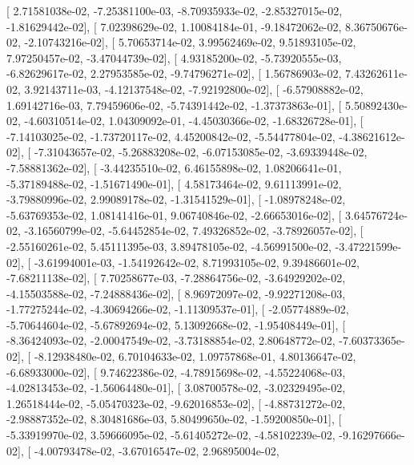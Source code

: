 \documentclass{article}
\begin{document}
       [  2.71581038e-02,  -7.25381100e-03,  -8.70935933e-02,
         -2.85327015e-02,  -1.81629442e-02],
       [  7.02398629e-02,   1.10084184e-01,  -9.18472062e-02,
          8.36750676e-02,  -2.10743216e-02],
       [  5.70653714e-02,   3.99562469e-02,   9.51893105e-02,
          7.97250457e-02,  -3.47044739e-02],
       [  4.93185200e-02,  -5.73920555e-03,  -6.82629617e-02,
          2.27953585e-02,  -9.74796271e-02],
       [  1.56786903e-02,   7.43262611e-02,   3.92143711e-03,
         -4.12137548e-02,  -7.92192800e-02],
       [ -6.57908882e-02,   1.69142716e-03,   7.79459606e-02,
         -5.74391442e-02,  -1.37373863e-01],
       [  5.50892430e-02,  -4.60310514e-02,   1.04309092e-01,
         -4.45030366e-02,  -1.68326728e-01],
       [ -7.14103025e-02,  -1.73720117e-02,   4.45200842e-02,
         -5.54477804e-02,  -4.38621612e-02],
       [ -7.31043657e-02,  -5.26883208e-02,  -6.07153085e-02,
         -3.69339448e-02,  -7.58881362e-02],
       [ -3.44235510e-02,   6.46155898e-02,   1.08206641e-01,
         -5.37189488e-02,  -1.51671490e-01],
       [  4.58173464e-02,   9.61113991e-02,  -3.79880996e-02,
          2.99089178e-02,  -1.31541529e-01],
       [ -1.08978248e-02,  -5.63769353e-02,   1.08141416e-01,
          9.06740846e-02,  -2.66653016e-02],
       [  3.64576724e-02,  -3.16560799e-02,  -5.64452854e-02,
          7.49326852e-02,  -3.78926057e-02],
       [ -2.55160261e-02,   5.45111395e-03,   3.89478105e-02,
         -4.56991500e-02,  -3.47221599e-02],
       [ -3.61994001e-03,  -1.54192642e-02,   8.71993105e-02,
          9.39486601e-02,  -7.68211138e-02],
       [  7.70258677e-03,  -7.28864756e-02,  -3.64929202e-02,
         -4.15503588e-02,  -7.24888436e-02],
       [  8.96972097e-02,  -9.92271208e-03,  -1.77275244e-02,
         -4.30694266e-02,  -1.11309537e-01],
       [ -2.05774889e-02,  -5.70644604e-02,  -5.67892694e-02,
          5.13092668e-02,  -1.95408449e-01],
       [ -8.36424093e-02,  -2.00047549e-02,  -3.73188854e-02,
          2.80648772e-02,  -7.60373365e-02],
       [ -8.12938480e-02,   6.70104633e-02,   1.09757868e-01,
          4.80136647e-02,  -6.68933000e-02],
       [  9.74622386e-02,  -4.78915698e-02,  -4.55224068e-03,
         -4.02813453e-02,  -1.56064480e-01],
       [  3.08700578e-02,  -3.02329495e-02,   1.26518444e-02,
         -5.05470323e-02,  -9.62016853e-02],
       [ -4.88731272e-02,  -2.98887352e-02,   8.30481686e-03,
          5.80499650e-02,  -1.59200850e-01],
       [ -5.33919970e-02,   3.59666095e-02,  -5.61405272e-02,
         -4.58102239e-02,  -9.16297666e-02],
       [ -4.00793478e-02,  -3.67016547e-02,   2.96895004e-02,
\end{document}
